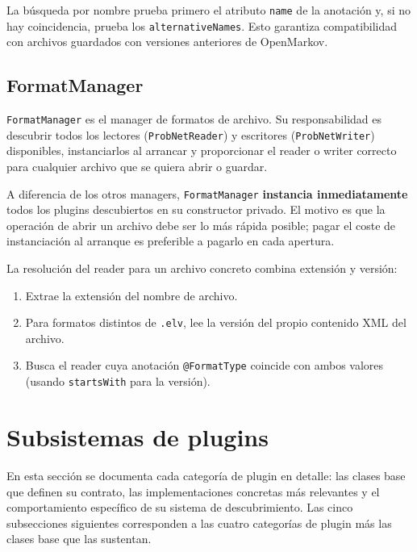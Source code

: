 \documentclass[12pt,a4paper,spanish]{article}
\begin{document}
La búsqueda por nombre prueba primero el atributo \texttt{name} de la anotación
y, si no hay coincidencia, prueba los \texttt{alternativeNames}. Esto garantiza
compatibilidad con archivos guardados con versiones anteriores de OpenMarkov.

\subsection{FormatManager}
\label{sec:formatmanager}

\texttt{FormatManager} es el manager de formatos de archivo. Su responsabilidad
es descubrir todos los lectores (\texttt{ProbNetReader}) y escritores
(\texttt{ProbNetWriter}) disponibles, instanciarlos al arrancar y proporcionar el
reader o writer correcto para cualquier archivo que se quiera abrir o guardar.

A diferencia de los otros managers, \texttt{FormatManager} \textbf{instancia
inmediatamente} todos los plugins descubiertos en su constructor privado. El motivo
es que la operación de abrir un archivo debe ser lo más rápida posible; pagar el
coste de instanciación al arranque es preferible a pagarlo en cada apertura.

La resolución del reader para un archivo concreto combina extensión y versión:
\begin{enumerate}
    \item Extrae la extensión del nombre de archivo.
    \item Para formatos distintos de \texttt{.elv}, lee la versión del propio
          contenido XML del archivo.
    \item Busca el reader cuya anotación \texttt{@FormatType} coincide con ambos
          valores (usando \texttt{startsWith} para la versión).
\end{enumerate}

\section{Subsistemas de plugins}
\label{sec:subsistemas}

En esta sección se documenta cada categoría de plugin en detalle: las clases base
que definen su contrato, las implementaciones concretas más relevantes y el
comportamiento específico de su sistema de descubrimiento. Las cinco subsecciones
siguientes corresponden a las cuatro categorías de plugin más las clases base que
las sustentan.
\end{document}
